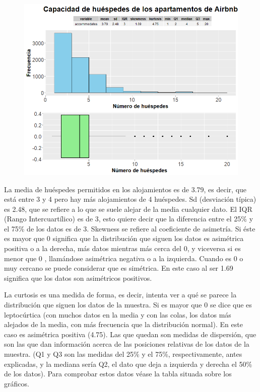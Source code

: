 \documentclass{article}
\begin{document}
\vspace{0.35cm}
\begin{figure}[h]
\hspace*{-0.15cm}
\centering
\includegraphics[scale = 0.6]{grafico_accommodates}
\end{figure}
\vspace{0.15cm}

La media de huéspedes permitidos en los alojamientos es de 3.79, es decir, que está entre 3 y 4 pero hay más alojamientos de 4 huéspedes.
Sd (desviación típica) es 2.48, que se refiere a lo que se suele alejar de la media cualquier dato.
El IQR (Rango Intercuartílico) es de 3, esto quiere decir que la diferencia entre el 25\% y el 75\% de los datos es de 3.
Skewness se refiere al coeficiente de asimetría. Si éste es mayor que 0 significa que la distribución que siguen los datos es asimétrica positiva o a la derecha, más datos mientras más cerca del 0, y viceversa si es menor que 0 , llamándose asimétrica negativa o a la izquierda. Cuando es 0 o muy cercano se puede considerar que es simétrica. En este caso al ser 1.69 significa que los datos son asimétricos positivos.

La curtosis es una medida de forma, es decir, intenta ver a qué se parece la distribución que siguen los datos de la muestra. Si es mayor que 0 se dice que es leptocúrtica (con muchos datos en la media y con las colas, los datos más alejados de la media, con más frecuencia que la distribución normal). En este caso es asimétrica positiva (4.75).
Las que quedan son medidas de dispersión, que son las que dan información acerca de las posiciones relativas de los datos de la muestra. (Q1 y Q3 son las medidas del 25\% y el 75\%, respectivamente, antes explicadas, y la mediana sería Q2, el dato que deja a izquierda y derecha el 50\% de los datos). Para comprobar estos datos véase la tabla situada sobre los gráficos.
\end{document}

